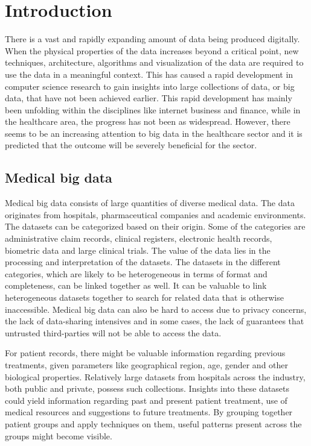 \section{Introduction}
There is a vast and rapidly expanding amount of data being produced digitally. When the physical properties of the data increases beyond a critical point, new techniques, architecture, algorithms and visualization of the data are required to use the data in a meaningful context. This has caused a rapid development in computer science research to gain insights into large collections of data, or big data, that have not been achieved earlier. This rapid development has mainly been unfolding within the disciplines like internet business and finance, while in the healthcare area, the progress has not been as widespread. However, there seems to be an increasing attention to big data in the healthcare sector and it is predicted that the outcome will be severely beneficial for the sector.\cite{gg}

\subsection{Medical big data}
Medical big data consists of large quantities of diverse medical data. The data originates from hospitals, pharmaceutical companies and academic environments. The datasets can be categorized based on their origin. Some of the categories are administrative claim records, clinical registers, electronic health records, biometric data and large clinical trials. The value of the data lies in the processing and interpretation of the datasets. The datasets in the different categories, which are likely to be heterogeneous in terms of format and completeness, can be linked together as well. It can be valuable to link heterogeneous datasets together to search for related data that is otherwise inaccessible.\cite{wp} Medical big data can also be hard to access due to privacy concerns, the lack of data-sharing intensives and in some cases, the lack of guarantees that untrusted third-parties will not be able to access the data. 

For patient records, there might be valuable information regarding previous treatments, given parameters like geographical region, age, gender and other biological properties. Relatively large datasets from hospitals across the industry, both public and private, possess such collections. Insights into these datasets could yield information regarding past and present patient treatment, use of medical resources and suggestions to future treatments. By grouping together patient groups and apply techniques on them, useful patterns present across the groups might become visible. 


